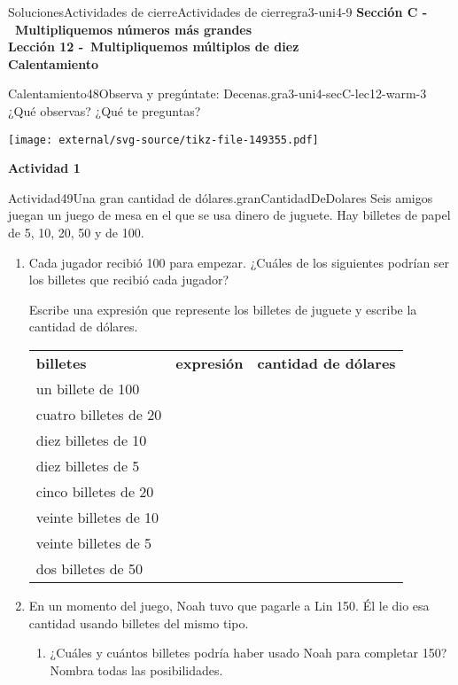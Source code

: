 \documentclass[twoside,10pt,]{article}
\newcommand{\tabularfont}{\relax}
\newcommand{\hrulethick} {\noalign{\hrule height 0.11em}}
\begin{document}
\begin{solutions-section}{Soluciones}{Actividades de cierre}{}{Actividades de cierre}{}{}{gra3-uni4-9}
\noindent\textbf{\large{}\space\textperiodcentered\space{}Sección C -~Multipliquemos números más grandes\\
\space\textperiodcentered\space{}Lección 12 -~Multipliquemos múltiplos de diez\\
\space\textperiodcentered\space{}Calentamiento}
\begin{explorationsolution}{Calentamiento}{48}{Observa y pregúntate: Decenas.}{gra3-uni4-secC-lec12-warm-3}%
¿Qué observas? ¿Qué te preguntas?%
\begin{image}{0}{1}{0}{}%
\texttt{[image: external/svg-source/tikz-file-149355.pdf]}
\end{image}%
\end{explorationsolution}%
\par\medskip
\noindent\textbf{\large{}\space\textperiodcentered\space{}Actividad 1}
\begin{activitysolution}{Actividad}{49}{Una gran cantidad de dólares.}{granCantidadDeDolares}%
Seis amigos juegan un juego de mesa en el que se usa dinero de juguete. Hay billetes de papel de \textdollar{}5, \textdollar{}10, \textdollar{}20, \textdollar{}50 y de \textdollar{}100.%
%
\begin{enumerate}
\item{}Cada jugador recibió \textdollar{}100 para empezar. ¿Cuáles de los siguientes podrían ser los billetes que recibió cada jugador?%
\par
Escribe una expresión que represente los billetes de juguete y escribe la cantidad de dólares.%
\begin{center}%
{\tabularfont%
\begin{tabular}{lll}
{\bfseries{}billetes}&{\bfseries{}expresión}&{\bfseries{}cantidad de dólares}\tabularnewline\hrulethick
un billete de \textdollar{}100&&\tabularnewline[0pt]
cuatro billetes de \textdollar{}20&&\tabularnewline[0pt]
diez billetes de \textdollar{}10&&\tabularnewline[0pt]
diez billetes de \textdollar{}5&&\tabularnewline[0pt]
cinco billetes de \textdollar{}20&&\tabularnewline[0pt]
veinte billetes de \textdollar{}10&&\tabularnewline[0pt]
veinte billetes de \textdollar{}5&&\tabularnewline[0pt]
dos billetes de \textdollar{}50&&
\end{tabular}
}%
\end{center}%
\item{}En un momento del juego, Noah tuvo que pagarle a Lin \textdollar{}150. Él le dio esa cantidad usando billetes del mismo tipo.%
%
\begin{enumerate}
\item{}¿Cuáles y cuántos billetes podría haber usado Noah para completar \textdollar{}150? Nombra todas las posibilidades.%

\end{enumerate}
\end{enumerate}
\end{activitysolution}
\end{solutions-section}
\end{document}
